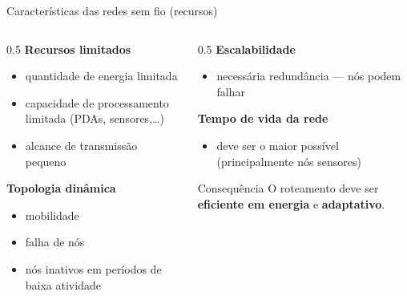 \documentclass[aspectratio=169,11pt]{beamer}
\begin{document}
\begin{frame}{Características das redes sem fio (recursos)}
  \begin{columns}
    \begin{column}{0.5\textwidth}
      \textbf{Recursos limitados}
      \begin{itemize}
        \item quantidade de energia limitada
        \item capacidade de processamento limitada (PDAs, sensores,\ldots)
        \item alcance de transmissão pequeno
      \end{itemize}
      \textbf{Topologia dinâmica}
      \begin{itemize}
        \item mobilidade
        \item falha de nós
        \item nós inativos em períodos de baixa atividade
      \end{itemize}
    \end{column}
    \begin{column}{0.5\textwidth}
      \textbf{Escalabilidade}
      \begin{itemize}
        \item necessária redundância --- nós podem falhar
      \end{itemize}
      \textbf{Tempo de vida da rede}
      \begin{itemize}
        \item deve ser o maior possível (principalmente nós sensores)
      \end{itemize}
      \begin{alertblock}{Consequência}
        O roteamento deve ser \textbf{eficiente em energia} e \textbf{adaptativo}.
      \end{alertblock}
    \end{column}
  \end{columns}
\end{frame}
\end{document}
